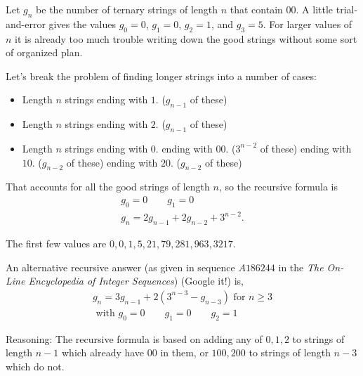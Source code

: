 \begin{Solution}{34.6}

Let $g_n$ be the number of ternary strings of length $n$ that contain $00$. A little trial{-}and{-}error 
gives the values $g_0 = 0$,
$g_1 = 0$, $g_2 = 1$, and $g_3 = 5$. For larger values of $n$ it is already too much trouble writing down the good strings without some sort of organized plan.

Let's break the problem of finding longer strings into a number of cases:
\begin{itemize}
\item Length $n$ strings ending with $1$. ($g_{n-1}$ of these)
\item Length $n$ strings ending with $2$. ($g_{n-1}$ of these)
\item Length $n$ strings ending with $0$.
  \subitem ending with $00$. ($3^{n-2}$ of these)
  \subitem ending with $10$. ($g_{n-2}$ of these)
  \subitem ending with $20$. ($g_{n-2}$ of these)
\end{itemize}

That accounts for all the good strings of length $n$, so the recursive formula is
\begin{gather*}
g_0 = 0 \qquad g_1 = 0\\
g_n = 2g_{n-1} +2g_{n-2} + 3^{n-2}.
\end{gather*}

The first few values are $0, 0, 1, 5, 21, 79, 281, 963, 3217$.

An alternative recursive answer (as given in sequence $A186244$ in the {\it The On-Line Encyclopedia of Integer Sequences}) (Google it!) is, 
\begin{gather*}
g_n = 3g_{n-1} + 2(3^{n-3} - g_{n-3}) \text{ for } n\geq 3\\
\text{ with } g_0 = 0 \qquad g_1 = 0 \qquad g_2 = 1
\end{gather*}

Reasoning: The recursive formula is based on adding any of $0,1,2$ to strings of length $n-1$ which already have $00$ in them, or $100,200$ to strings of length $n-3$ which do not.


\end{Solution}

